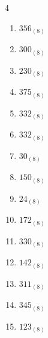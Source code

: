 \begin{multicols}{4}
\begin{enumerate}
\columnbreak %

\resetques

  \item $356_{(8)}$

        \phantom{$=238$}

  \item $300_{(8)}$

        \phantom{$=192$}

  \item $230_{(8)}$

        \phantom{$=152$}

  \item $375_{(8)}$

        \phantom{$=253$}

  \item $332_{(8)}$

        \phantom{$=218$}

  \item $332_{(8)}$

        \phantom{$=218$}

  \item $30_{(8)}$

        \phantom{$=24$}

  \item $150_{(8)}$

        \phantom{$=104$}

  \item $24_{(8)}$

        \phantom{$=20$}

  \item $172_{(8)}$

        \phantom{$=122$}

  \item $330_{(8)}$

        \phantom{$=216$}

  \item $142_{(8)}$

        \phantom{$=98$}

  \item $311_{(8)}$

        \phantom{$=201$}

  \item $345_{(8)}$

        \phantom{$=229$}

  \item $123_{(8)}$

        \phantom{$=83$}


\end{enumerate}
\end{multicols}
